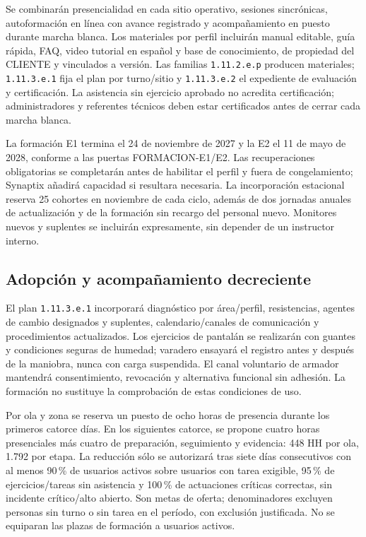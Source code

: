 Se combinarán presencialidad en cada sitio operativo, sesiones sincrónicas, autoformación en línea con avance registrado y acompañamiento en puesto durante marcha blanca. Los materiales por perfil incluirán manual editable, guía rápida, FAQ, video tutorial en español y base de conocimiento, de propiedad del CLIENTE y vinculados a versión. Las familias \texttt{1.11.2.e.p} producen materiales; \texttt{1.11.3.e.1} fija el plan por turno/sitio y \texttt{1.11.3.e.2} el expediente de evaluación y certificación. La asistencia sin ejercicio aprobado no acredita certificación; administradores y referentes técnicos deben estar certificados antes de cerrar cada marcha blanca.

La formación E1 termina el 24 de noviembre de 2027 y la E2 el 11 de mayo de 2028, conforme a las puertas FORMACION-E1/E2. Las recuperaciones obligatorias se completarán antes de habilitar el perfil y fuera de congelamiento; Synaptix añadirá capacidad si resultara necesaria. La incorporación estacional reserva 25 cohortes en noviembre de cada ciclo, además de dos jornadas anuales de actualización y de la formación sin recargo del personal nuevo. Monitores nuevos y suplentes se incluirán expresamente, sin depender de un instructor interno.~\parencite[arts.~89--90; p.~45]{bases-admin}~\parencite[RT-22.01--06; p.~38]{bases-transversales}




\subsection{Adopción y acompañamiento decreciente} %
El plan \texttt{1.11.3.e.1} incorporará diagnóstico por área/perfil, resistencias, agentes de cambio designados y suplentes, calendario/canales de comunicación y procedimientos actualizados. Los ejercicios de pantalán se realizarán con guantes y condiciones seguras de humedad; varadero ensayará el registro antes y después de la maniobra, nunca con carga suspendida. El canal voluntario de armador mantendrá consentimiento, revocación y alternativa funcional sin adhesión. La formación no sustituye la comprobación de estas condiciones de uso.

Por ola y zona se reserva un puesto de ocho horas de presencia durante los primeros catorce días. En los siguientes catorce, se propone cuatro horas presenciales más cuatro de preparación, seguimiento y evidencia: 448 HH por ola, 1.792 por etapa. La reducción sólo se autorizará tras siete días consecutivos con al menos 90\,\% de usuarios activos sobre usuarios con tarea exigible, 95\,\% de ejercicios/tareas sin asistencia y 100\,\% de actuaciones críticas correctas, sin incidente crítico/alto abierto. Son metas de oferta; denominadores excluyen personas sin turno o sin tarea en el período, con exclusión justificada. No se equiparan las plazas de formación a usuarios activos.

